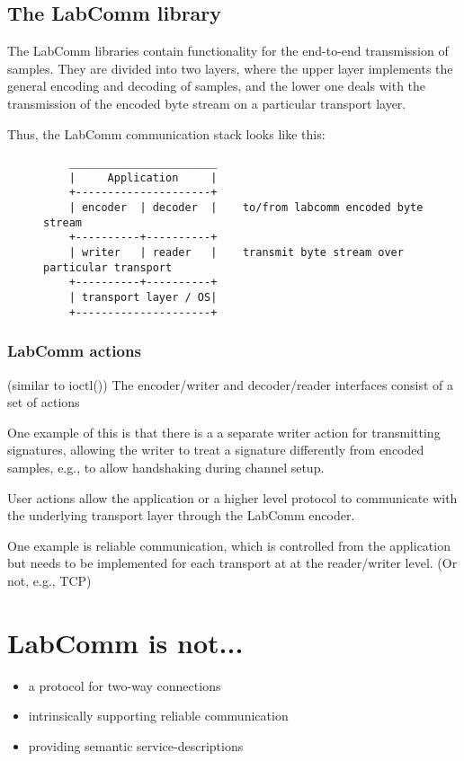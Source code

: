 \documentclass[a4paper]{article}
\begin{document}
\subsection{The LabComm library}

The LabComm libraries contain functionality for the end-to-end transmission
of samples. They are divided into two layers, where the upper layer implements
the general encoding and decoding of samples, and the lower one deals with
the transmission of the encoded byte stream on a particular transport layer.

Thus, the LabComm communication stack looks like this:
\begin{figure}[h!]
\begin{verbatim}
    _______________________
    |     Application     |
    +---------------------+
    | encoder  | decoder  |    to/from labcomm encoded byte stream
    +----------+----------+
    | writer   | reader   |    transmit byte stream over particular transport
    +----------+----------+
    | transport layer / OS|
    +---------------------+
\end{verbatim}
\end{figure}
\subsubsection{LabComm actions}

(similar to ioctl())
The encoder/writer and decoder/reader interfaces consist of a set of actions

One example of this is that there is a a separate writer action for
transmitting signatures, allowing the writer to treat a signature differently
from encoded samples, e.g., to allow handshaking during channel setup.

User actions allow the application or a higher level
protocol to communicate with the underlying transport layer through the LabComm
encoder.

One example is reliable communication, which is controlled from the application
but needs to be implemented for each transport at at the reader/writer level.
(Or not, e.g., TCP)

\section{LabComm is not...}

\begin{itemize}
\item a protocol for two-way connections
\item intrinsically supporting reliable communication
\item providing semantic service-descriptions
\end{itemize}
\end{document}
